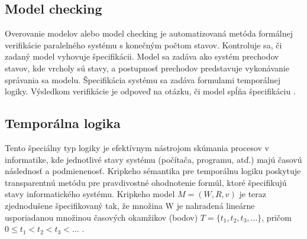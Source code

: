 \subsection{Model checking}
Overovanie modelov alebo model checking je automatizovaná metóda formálnej verifikácie 
paralelného systému s konečným počtom stavov. Kontroluje sa, či zadaný model vyhovuje špecifikácii. 
Model sa zadáva ako systém prechodov stavov, kde vrcholy sú stavy, a postupnosť prechodov predstavuje
vykonávanie správania sa modelu. Špecifikácia systému sa zadáva formulami temporálnej logiky. 
Výsledkom verifikácie je odpoveď na otázku, či model spĺňa špecifikáciu \cite{br4}.

\subsection{Temporálna logika}  
Tento špeciálny typ logiky je efektívnym nástrojom skúmania procesov v informatike, kde
jednotlivé stavy systému (počítača, programu, atď.) majú časovú následnosť a podmienenosť. 
Kripkeho sémantika pre temporálnu logiku poskytuje transparentnú metódu pre pravdivostné ohodnotenie formúl, 
ktoré špecifikujú stavy informatického systému. Kripkeho model $M = (W, R, v)$ je teraz zjednodušene
špecifikovaný tak, že množina W je nahradená lineárne usporiadanou množinou časových okamžikov 
(bodov) $T = \{t_1, t_2, t_3, ...\}$, pričom $0 \leq t_1 < t_2 < t_3 < ...$ \cite{br10}.





